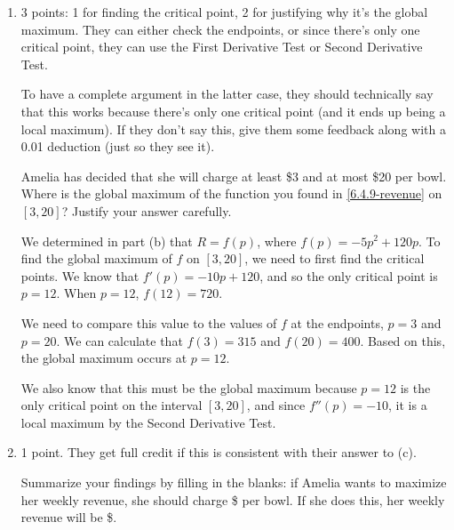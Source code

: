 \documentclass{article}
\begin{document}
\begin{enumerate}
\begin{enumerate}
  \item

    \begin{grading}
      3 points: 1 for finding the critical point, 2 for justifying why it's the global maximum. They can either check the endpoints, or since there's only one critical point, they can use the First Derivative Test or Second Derivative Test.

      To have a complete argument in the latter case, they should technically say that this works because there's only one critical point (and it ends up being a local maximum). If they don't say this, give them some feedback along with a 0.01 deduction (just so they see it). 
    \end{grading}

    \begin{problem}[\vfill]
      Amelia has decided that she will charge at least \$3 and at most \$20 per bowl. Where is the global maximum of the function you found in \ref{6.4.9-revenue} on $[3, 20]$? Justify your answer carefully.
    \end{problem}

    \begin{solution}
      We determined in part (b) that $R=f(p)$, where $f(p) = -5p^2+120p$. To find
      the global maximum of $f$ on $[3, 20]$, we need to first find the critical points.
      We know that $f'(p)=-10p+120$, and so the only critical point is $p=12$. When
      $p=12$, $f(12)=720$.

      We need to compare this value to the values of $f$ at the endpoints, $p=3$ and
      $p=20$. We can calculate that $f(3)=315$ and $f(20) = 400$. Based on this,
      the global maximum occurs at $p=12$.

      We also know that this must be the global maximum because $p=12$ is the only
      critical point on the interval $[3, 20]$, and since $f''(p)=-10$, it is a
      local maximum by the Second Derivative Test.
    \end{solution}

  \item

    \begin{grading}
      1 point. They get full credit if this is consistent with their answer to (c). 
    \end{grading}

    \begin{problem}[\newpage]
      Summarize your findings by filling in the blanks: if Amelia wants to maximize her weekly revenue, she should charge \$ per bowl. If she does this, her weekly revenue will be \$. 
    \end{problem}


\end{enumerate}
\end{enumerate}
\end{document}
